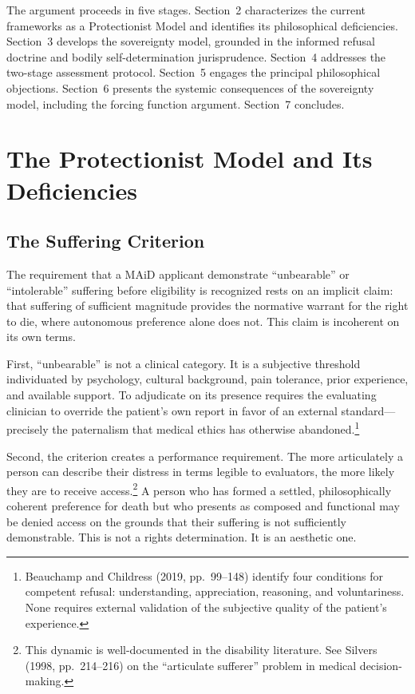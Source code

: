 \documentclass[11pt, letterpaper]{article}
\begin{document}
The argument proceeds in five stages. Section~2 characterizes the current frameworks as
a Protectionist Model and identifies its philosophical deficiencies. Section~3 develops
the sovereignty model, grounded in the informed refusal doctrine and bodily
self-determination jurisprudence. Section~4 addresses the two-stage assessment protocol.
Section~5 engages the principal philosophical objections. Section~6 presents the systemic
consequences of the sovereignty model, including the forcing function argument.
Section~7 concludes.

\section{The Protectionist Model and Its Deficiencies}

\subsection{The Suffering Criterion}

The requirement that a MAiD applicant demonstrate ``unbearable'' or ``intolerable''
suffering before eligibility is recognized rests on an implicit claim: that suffering
of sufficient magnitude provides the normative warrant for the right to die, where
autonomous preference alone does not. This claim is incoherent on its own terms.

First, ``unbearable'' is not a clinical category. It is a subjective threshold
individuated by psychology, cultural background, pain tolerance, prior experience,
and available support. To adjudicate on its presence requires the evaluating clinician
to override the patient's own report in favor of an external standard---precisely the
paternalism that medical ethics has otherwise abandoned.\footnote{%
  Beauchamp and Childress (2019, pp.\ 99--148) identify four conditions for competent
  refusal: understanding, appreciation, reasoning, and voluntariness. None requires
  external validation of the subjective quality of the patient's experience.}

Second, the criterion creates a performance requirement. The more articulately a person
can describe their distress in terms legible to evaluators, the more likely they are
to receive access.\footnote{%
  This dynamic is well-documented in the disability literature. See Silvers (1998,
  pp.\ 214--216) on the ``articulate sufferer'' problem in medical decision-making.}
A person who has formed a settled, philosophically coherent preference for death but
who presents as composed and functional may be denied access on the grounds that their
suffering is not sufficiently demonstrable. This is not a rights determination. It is
an aesthetic one.
\end{document}
